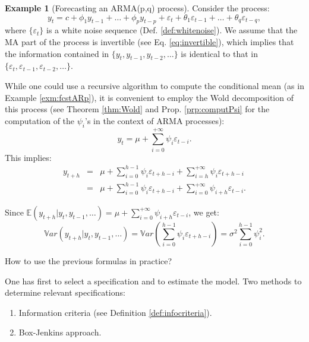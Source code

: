 \documentclass[
  12pt,
]{book}
\providecommand{\tightlist}{%
  \setlength{\itemsep}{0pt}\setlength{\parskip}{0pt}}
\theoremstyle{definition}
\theoremstyle{definition}
\newtheorem{example}{Example}[chapter]
\theoremstyle{definition}
\theoremstyle{definition}
\theoremstyle{remark}
\begin{document}
\begin{example}[Forecasting an ARMA(p,q) process]
\protect\hypertarget{exm:fcstARMApq}{}\label{exm:fcstARMApq}Consider the process:
\begin{equation}
y_t = c + \phi_1 y_{t-1} + \dots + \phi_p y_{t-p} + \varepsilon_t + \theta_1 \varepsilon_{t-1} + \dots + \theta_q \varepsilon_{t-q},\label{eq:armaForecast}
\end{equation}
where \(\{\varepsilon_t\}\) is a white noise sequence (Def. \ref{def:whitenoise}). We assume that the MA part of the process is invertible (see Eq. \eqref{eq:invertible}), which implies that the information contained in \(\{y_{t},y_{t-1},y_{t-2},\dots\}\) is identical to that in \(\{\varepsilon_{t},\varepsilon_{t-1},\varepsilon_{t-2},\dots\}\).

While one could use a recursive algorithm to compute the conditional mean (as in Example \ref{exm:fcstARp}), it is convenient to employ the Wold decomposition of this process (see Theorem \ref{thm:Wold} and Prop. \ref{prp:computPsi} for the computation of the \(\psi_i\)'s in the context of ARMA processes):
\[
y_t = \mu + \sum_{i=0}^{+\infty} \psi_i \varepsilon_{t-i}.
\]
This implies:
\begin{eqnarray*}
y_{t+h} &=& \mu + \sum_{i=0}^{h-1} \psi_i \varepsilon_{t+h-i} + \sum_{i=h}^{+\infty} \psi_i \varepsilon_{t+h-i}\\
&=& \mu + \sum_{i=0}^{h-1} \psi_i \varepsilon_{t+h-i} + \sum_{i=0}^{+\infty} \psi_{i+h} \varepsilon_{t-i}.
\end{eqnarray*}

Since \(\mathbb{E}(y_{t+h}|y_t,y_{t-1},\dots)=\mu+\sum_{i=0}^{+\infty} \psi_{i+h} \varepsilon_{t-i}\), we get:
\[
\mathbb{V}ar(y_{t+h}|y_t,y_{t-1},\dots) =\mathbb{V}ar\left(\sum_{i=0}^{h-1} \psi_i \varepsilon_{t+h-i}\right)= \sigma^2 \sum_{i=0}^{h-1} \psi_i^2.
\]
\end{example}

How to use the previous formulas in practice?

One has first to select a specification and to estimate the model.
Two methods to determine relevant specifications:

\begin{enumerate}
\def\labelenumi{\alph{enumi}.}
\tightlist
\item
  Information criteria (see Definition \ref{def:infocriteria}).
\item
  Box-Jenkins approach.
\end{enumerate}
\end{document}
